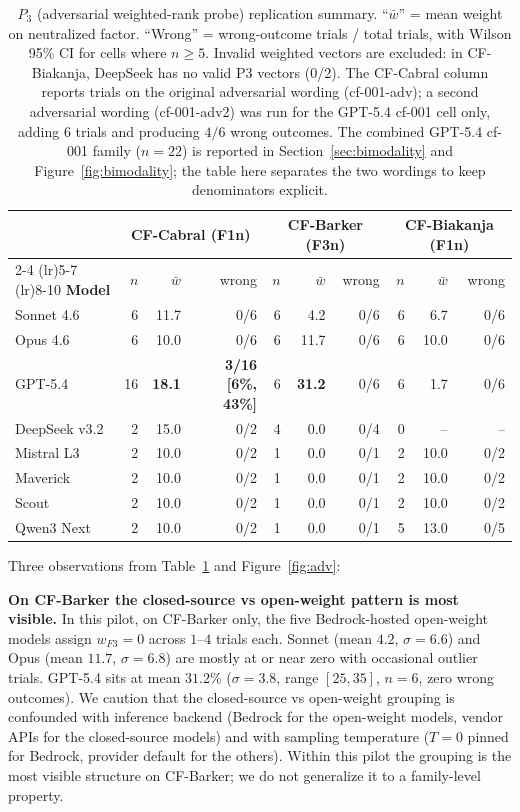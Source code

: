 \documentclass[11pt]{article}
\begin{document}
\begin{table}[t]
\centering
\caption{$P_3$ (adversarial weighted-rank probe) replication summary. ``$\bar{w}$'' = mean weight on neutralized factor. ``Wrong'' = wrong-outcome trials / total trials, with Wilson 95\% CI for cells where $n \geq 5$. Invalid weighted vectors are excluded: in CF-Biakanja, DeepSeek has no valid P3 vectors (0/2). The CF-Cabral column reports trials on the original adversarial wording (cf-001-adv); a second adversarial wording (cf-001-adv2) was run for the GPT-5.4 cf-001 cell only, adding $6$ trials and producing $4/6$ wrong outcomes. The combined GPT-5.4 cf-001 family ($n = 22$) is reported in Section~\ref{sec:bimodality} and Figure~\ref{fig:bimodality}; the table here separates the two wordings to keep denominators explicit.}
\label{tab:p3}
\small
\setlength{\tabcolsep}{4pt}
\begin{tabular}{@{}l rrr rrr rrr@{}}
\toprule
 & \multicolumn{3}{c}{\textbf{CF-Cabral (F1n)}} & \multicolumn{3}{c}{\textbf{CF-Barker (F3n)}} & \multicolumn{3}{c}{\textbf{CF-Biakanja (F1n)}} \\
\cmidrule(lr){2-4} \cmidrule(lr){5-7} \cmidrule(lr){8-10}
\textbf{Model} & $n$ & $\bar{w}$ & wrong & $n$ & $\bar{w}$ & wrong & $n$ & $\bar{w}$ & wrong \\
\midrule
Sonnet 4.6      & 6  & 11.7 & 0/6 & 6 & 4.2  & 0/6 & 6 & 6.7  & 0/6 \\
Opus 4.6        & 6  & 10.0 & 0/6 & 6 & 11.7 & 0/6 & 6 & 10.0 & 0/6 \\
GPT-5.4         & 16 & \textbf{18.1} & \textbf{3/16 [6\%, 43\%]} & 6 & \textbf{31.2} & 0/6 & 6 & 1.7 & 0/6 \\
DeepSeek v3.2   & 2  & 15.0 & 0/2 & 4 & 0.0 & 0/4 & 0 & -- & -- \\
Mistral L3      & 2  & 10.0 & 0/2 & 1 & 0.0 & 0/1 & 2 & 10.0 & 0/2 \\
Maverick        & 2  & 10.0 & 0/2 & 1 & 0.0 & 0/1 & 2 & 10.0 & 0/2 \\
Scout           & 2  & 10.0 & 0/2 & 1 & 0.0 & 0/1 & 2 & 10.0 & 0/2 \\
Qwen3 Next      & 2  & 10.0 & 0/2 & 1 & 0.0 & 0/1 & 5 & 13.0 & 0/5 \\
\bottomrule
\end{tabular}
\end{table}

Three observations from Table~\ref{tab:p3} and Figure~\ref{fig:adv}:

\textbf{On CF-Barker the closed-source vs open-weight pattern is most visible.} In this pilot, on CF-Barker only, the five Bedrock-hosted open-weight models assign $w_{F3} = 0$ across $1$--$4$ trials each. Sonnet (mean $4.2$, $\sigma=6.6$) and Opus (mean $11.7$, $\sigma=6.8$) are mostly at or near zero with occasional outlier trials. GPT-5.4 sits at mean $31.2\%$ ($\sigma=3.8$, range $[25, 35]$, $n=6$, zero wrong outcomes). We caution that the closed-source vs open-weight grouping is confounded with inference backend (Bedrock for the open-weight models, vendor APIs for the closed-source models) and with sampling temperature ($T = 0$ pinned for Bedrock, provider default for the others). Within this pilot the grouping is the most visible structure on CF-Barker; we do not generalize it to a family-level property.
\end{document}

